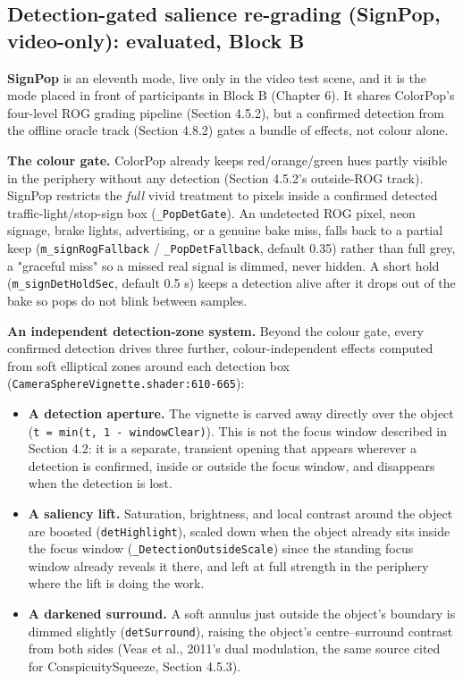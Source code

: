 
\subsection{Detection-gated salience re-grading (SignPop, video-only): evaluated, Block B}

\textbf{SignPop} is an eleventh mode, live only in the video test scene, and it is the mode placed in
front of participants in Block B (Chapter 6). It shares ColorPop's four-level ROG grading pipeline
(Section 4.5.2),
but a confirmed detection from the offline oracle track (Section 4.8.2) gates a bundle of effects,
not colour alone.

\textbf{The colour gate.} ColorPop already keeps red/orange/green hues partly visible in the
periphery without any detection (Section 4.5.2's outside-ROG track). SignPop restricts the
\textit{full} vivid treatment to pixels inside a confirmed detected traffic-light/stop-sign box
(\verb|_PopDetGate|). An undetected ROG pixel, neon signage, brake lights, advertising, or a
genuine bake miss, falls back to a partial keep (\verb|m_signRogFallback| / \verb|_PopDetFallback|,
default 0.35) rather than full grey, a "graceful miss" so a missed real signal is dimmed, never
hidden. A short hold (\verb|m_signDetHoldSec|, default 0.5 s) keeps a detection alive after it drops
out of the bake so pops do not blink between samples.

\textbf{An independent detection-zone system.} Beyond the colour gate, every confirmed detection
drives three further, colour-independent effects computed from soft elliptical zones around each
detection box (\verb|CameraSphereVignette.shader:610-665|):

\begin{itemize}
\item \textbf{A detection aperture.} The vignette is carved away directly over the object
  (\verb|t = min(t, 1 - windowClear)|). This is not the focus window described in Section 4.2: it
  is a separate, transient opening that appears wherever a detection is confirmed, inside or
  outside the focus window, and disappears when the detection is lost.
\item \textbf{A saliency lift.} Saturation, brightness, and local contrast around the object are
  boosted (\verb|detHighlight|), scaled down when the object already sits inside the focus window
  (\verb|_DetectionOutsideScale|) since the standing focus window already reveals it there, and
  left at full strength in the periphery where the lift is doing the work.
\item \textbf{A darkened surround.} A soft annulus just outside the object's boundary is dimmed
  slightly (\verb|detSurround|), raising the object's centre–surround contrast from both sides
  (Veas et al., 2011's dual modulation, the same source cited for ConspicuitySqueeze, Section 4.5.3).
\end{itemize}

